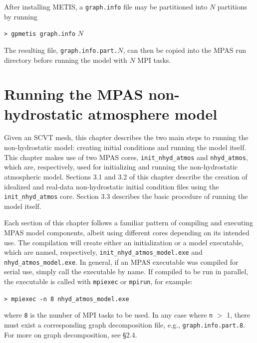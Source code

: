\documentclass[11pt]{report}
\begin{document}
After installing METIS, a {\tt graph.info} file may be partitioned into $N$ partitions by running

\vspace{12pt}
{\tt > gpmetis graph.info} $N$
\vspace{12pt}

\noindent The resulting file, {\tt graph.info.part.}$N$, can then be copied into the MPAS run directory
before running the model with $N$ MPI tasks.



\chapter{Running the MPAS non-hydrostatic atmosphere model}

\setlength\LTleft{0.0in}

Given an SCVT mesh, this chapter describes the two main steps to running the non-hydrostatic model: creating initial conditions and running the model itself.  This chapter makes use of two MPAS cores, {\tt init\_nhyd\_atmos} and {\tt nhyd\_atmos}, which are, respectively, used for initializing and running the non-hydrostatic atmospheric model.  Sections 3.1 and 3.2 of this chapter describe the creation of idealized and real-data non-hydrostatic initial condition files using the {\tt init\_nhyd\_atmos} core.   Section 3.3 describes the basic procedure of running the model itself.

Each section of this chapter follows a familiar pattern of compiling and executing MPAS model components, albeit using different cores depending on its intended use.  The compilation will create either an initialization or a model executable, which are named, respectively, {\tt init\_nhyd\_atmos\_model.exe} and {\tt nhyd\_atmos\_model.exe}.  In general, if an MPAS executable was compiled for serial use, simply call the executable by name. If compiled to be run in parallel, the executable is called with {\tt mpiexec} or {\tt mpirun}, for example:

\vspace{12pt}
{\tt > mpiexec -n 8 nhyd\_atmos\_model.exe}
\vspace{12pt}


\noindent where {\tt 8} is the number of MPI tasks to be used.  In any case where {\tt n} $>$ 1, there must exist a corresponding graph decomposition file, e.g., {\tt graph.info.part.8}. For more on graph decomposition, see \S 2.4.  
\end{document}
